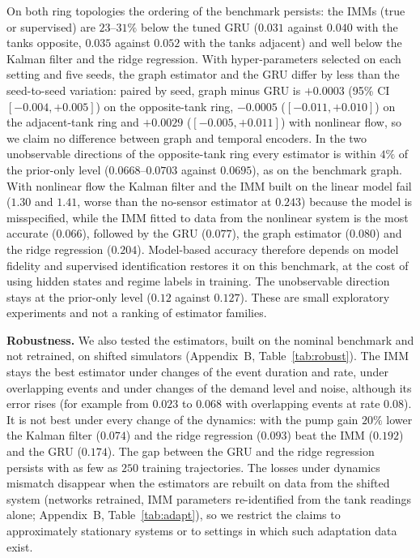 \documentclass[conference]{IEEEtran}
\begin{document}
On both ring topologies the ordering of the benchmark persists: the IMMs (true or supervised) are $23$--$31\%$ below the tuned GRU ($0.031$ against $0.040$ with the tanks opposite, $0.035$ against $0.052$ with the tanks adjacent) and well below the Kalman filter and the ridge regression. With hyper-parameters selected on each setting and five seeds, the graph estimator and the GRU differ by less than the seed-to-seed variation: paired by seed, graph minus GRU is $+0.0003$ (95\% CI $[-0.004,+0.005]$) on the opposite-tank ring, $-0.0005$ ($[-0.011,+0.010]$) on the adjacent-tank ring and $+0.0029$ ($[-0.005,+0.011]$) with nonlinear flow, so we claim no difference between graph and temporal encoders. In the two unobservable directions of the opposite-tank ring every estimator is within $4\%$ of the prior-only level ($0.0668$--$0.0703$ against $0.0695$), as on the benchmark graph. With nonlinear flow the Kalman filter and the IMM built on the linear model fail ($1.30$ and $1.41$, worse than the no-sensor estimator at $0.243$) because the model is misspecified, while the IMM fitted to data from the nonlinear system is the most accurate ($0.066$), followed by the GRU ($0.077$), the graph estimator ($0.080$) and the ridge regression ($0.204$). Model-based accuracy therefore depends on model fidelity and supervised identification restores it on this benchmark, at the cost of using hidden states and regime labels in training. The unobservable direction stays at the prior-only level ($0.12$ against $0.127$). These are small exploratory experiments and not a ranking of estimator families.

\textbf{Robustness.} We also tested the estimators, built on the nominal benchmark and not retrained, on shifted simulators (Appendix~B, Table~\ref{tab:robust}). The IMM stays the best estimator under changes of the event duration and rate, under overlapping events and under changes of the demand level and noise, although its error rises (for example from $0.023$ to $0.068$ with overlapping events at rate $0.08$). It is not best under every change of the dynamics: with the pump gain $20\%$ lower the Kalman filter ($0.074$) and the ridge regression ($0.093$) beat the IMM ($0.192$) and the GRU ($0.174$). The gap between the GRU and the ridge regression persists with as few as $250$ training trajectories. The losses under dynamics mismatch disappear when the estimators are rebuilt on data from the shifted system (networks retrained, IMM parameters re-identified from the tank readings alone; Appendix~B, Table~\ref{tab:adapt}), so we restrict the claims to approximately stationary systems or to settings in which such adaptation data exist.
\end{document}
